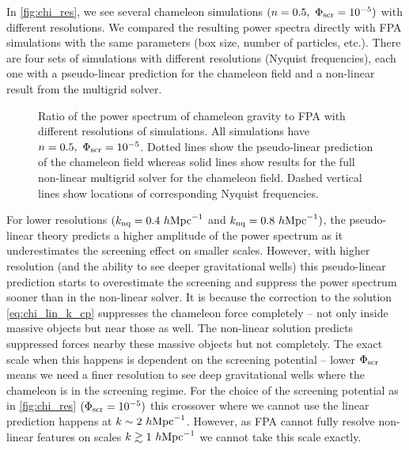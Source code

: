 In \autoref{fig:chi_res}, we see several chameleon simulations $(n=0.5,\ \Phi_{\text{\scriptsize scr}}=10^{-5})$ with different resolutions. We compared the resulting power spectra directly with FPA simulations with the same parameters (box size, number of particles, etc.). There are four sets of simulations with different resolutions (Nyquist frequencies), each one with a pseudo-linear prediction for the chameleon field and a non-linear result from the multigrid solver.

\begin{figure}[bt]
	\centering
	  \begin{subfigure}{0.85\textwidth}
	  \end{subfigure}
	  \begin{subfigure}{0.85\textwidth}
	  \end{subfigure}
	\caption{Ratio of the power spectrum of chameleon gravity to FPA with different resolutions of simulations. All simulations have $n=0.5,\ \Phi_{\text{\scriptsize scr}}=10^{-5}$. Dotted lines show the pseudo-linear prediction of the chameleon field whereas solid lines show results for the full non-linear multigrid solver for the chameleon field. Dashed vertical lines show locations of corresponding Nyquist frequencies.}
	\label{fig:chi_res}
\end{figure}
For lower resolutions $(k_{\rm nq} = 0.4~h\text{Mpc}^{-1}$ and $k_{\rm nq} = 0.8~h\text{Mpc}^{-1})$, the pseudo-linear theory predicts a higher amplitude of the power spectrum as it underestimates the screening effect on smaller scales. However, with higher resolution (and the ability to see deeper gravitational wells) this pseudo-linear prediction starts to overestimate the screening and suppress the power spectrum sooner than in the non-linear solver. It is because the correction to the solution \eqref{eq:chi_lin_k_cp} suppresses the chameleon force completely -- not only inside massive objects but near those as well. The non-linear solution predicts suppressed forces nearby these massive objects but not completely. The exact scale when this happens is dependent on the screening potential -- lower $\Phi_{\text{\scriptsize scr}}$ means we need a finer resolution to see deep gravitational wells where the chameleon is in the screening regime. For the choice of the screening potential as in \autoref{fig:chi_res} $(\Phi_{\text{\scriptsize scr}}=10^{-5})$ this crossover where we cannot use the linear prediction happens at $k\sim2~h\text{Mpc}^{-1}$. However, as FPA cannot fully resolve non-linear features on scales $k\gtrsim1~h\text{Mpc}^{-1}$  we cannot take this scale exactly.

